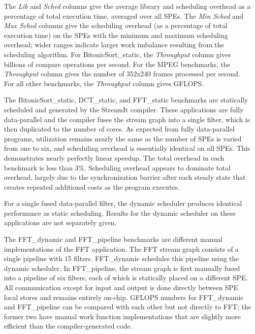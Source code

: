 The \emph{Lib} and \emph{Sched} columns give the average library and scheduling overhead
as a percentage of total execution time, averaged over all SPEs.
The \emph{Min Sched} and \emph{Max Sched} columns give the scheduling overhead
(as a percentage of total execution time) on the SPEs with the minimum and maximum
scheduling overhead; wider ranges indicate larger work imbalance
resulting from the scheduling algorithm.
For \textsf{BitonicSort\_static}, the \emph{Throughput} column gives
billions of compare operations per second. For the MPEG benchmarks,
the \emph{Throughput} column gives the number of 352x240 frames processed per second.
For all other benchmarks, the \emph{Throughput} column gives GFLOPS.

The \textsf{BitonicSort\_static}, \textsf{DCT\_static}, and \textsf{FFT\_static} benchmarks
are statically scheduled and generated by the StreamIt compiler.
These applications are fully data-parallel and the compiler fuses the stream graph
into a single filter, which is then duplicated to the number of cores.
As expected from fully data-parallel programs, utilization remains nearly the same
as the number of SPEs is varied from one to six, and scheduling overhead is essentially identical
on all SPEs. This demonstrates nearly perfectly linear speedup.
The total overhead in each benchmark is less than 3\%. Scheduling overhead appears
to dominate total overhead, largely due to the synchronization barrier after each steady state
that creates repeated additional costs as the program executes.

For a single fused data-parallel filter, the dynamic scheduler produces identical performance as static scheduling. Results for the dynamic scheduler on these applications are not separately given.

The \textsf{FFT\_dynamic} and \textsf{FFT\_pipeline} benchmarks are different manual implementations of the FFT application. The FFT stream graph consists of a single pipeline with 15 filters. \textsf{FFT\_dynamic} schedules this pipeline using the dynamic scheduler. In \textsf{FFT\_pipeline}, the stream graph is first manually fused into a pipeline of six filters, each of which is statically placed on a different SPE. All communication except for input and output is done directly between SPE local stores and remains entirely on-chip. GFLOPS numbers for \textsf{FFT\_dynamic} and \textsf{FFT\_pipeline} can be compared with each other but not directly to \textsf{FFT}; the former two have manual work function implementations that are slightly more efficient than the compiler-generated code.

